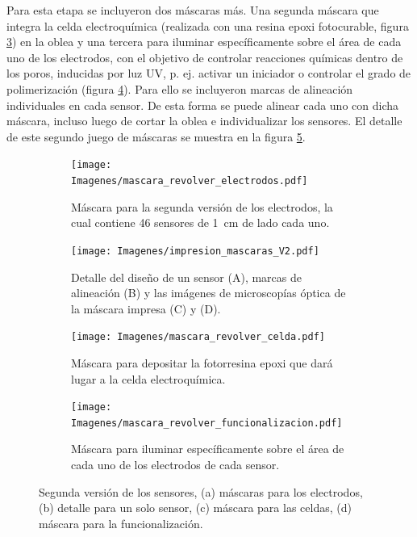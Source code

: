 {		     Para esta etapa se incluyeron dos máscaras más. Una segunda máscara que integra la celda electroquímica (realizada con una resina epoxi fotocurable, figura \ref{fig:mascara_su8}) en la oblea y una tercera para iluminar específicamente sobre el área de cada uno de los electrodos, con el objetivo de controlar reacciones químicas dentro de los poros, inducidas por luz UV, p. ej. activar un iniciador o controlar el grado de polimerización  (figura \ref{fig:mascara_funcionalizacion}).\cite{Andrieu-Brunsen2015,Herzog2015} Para ello se incluyeron marcas de alineación individuales en cada sensor. De esta forma se puede alinear cada uno con dicha máscara, incluso luego de cortar la oblea e individualizar los sensores. El detalle de este segundo juego de máscaras se muestra en la figura \ref{fig:impresion_diseno_V2}.
					\begin{figure}[th!]
			 	   	    \centering
			 	   	    \begin{subfigure}[t]{0.495\textwidth}
			        	\texttt{[image: Imagenes/mascara\_revolver\_electrodos.pdf]}
			       		\caption{Máscara para la segunda versión de los electrodos, la cual contiene 46 sensores de \SI{1}{cm} de lado cada uno.}
			         	\label{fig:mascara_v2}
			     		\end{subfigure}
			     		\begin{subfigure}[t]{0.495\textwidth}
			     		\texttt{[image: Imagenes/impresion\_mascaras\_V2.pdf]}
			    		\caption{Detalle del diseño de un sensor (A), marcas de alineación (B) y las imágenes de microscopías óptica de la máscara impresa (C) y (D).}
			    		\label{fig:impresion_diseno_v2_b}	
						\end{subfigure}
			     		\begin{subfigure}[t]{0.495\textwidth}
			         	\texttt{[image: Imagenes/mascara\_revolver\_celda.pdf]}
			        	\caption{Máscara para depositar la fotorresina epoxi que dará lugar a la celda electroquímica.}
			         	\label{fig:mascara_su8}
			     		\end{subfigure}
						\begin{subfigure}[t]{0.495\textwidth}
			     		\texttt{[image: Imagenes/mascara\_revolver\_funcionalizacion.pdf]}
			        	\caption{Máscara para iluminar específicamente sobre el área de cada uno de los electrodos de cada sensor.}
			         	\label{fig:mascara_funcionalizacion}
			     		\end{subfigure}
			     		\caption[Juego de máscara. Segunda versión]{Segunda versión de los sensores, (a) máscaras  para los electrodos, (b) detalle para un solo sensor, (c) máscara para las celdas, (d) máscara para la funcionalización.}
			     		\label{fig:impresion_diseno_V2}
			     	   	\end{figure}
	
}
